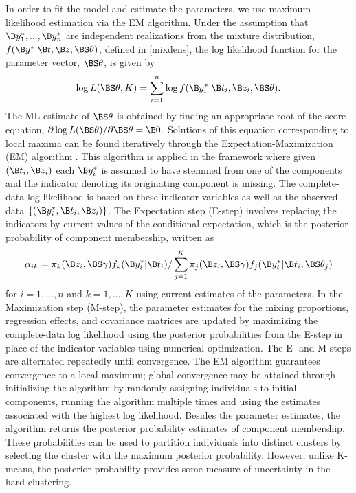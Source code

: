 In order to fit the model and estimate the parameters, we use maximum likelihood estimation via the EM algorithm. Under the assumption that $\B y^{*}_{1},...,\B y^{*}_{n}$ are independent realizations from the mixture distribution, $f(\B y^{*} | \B t, \B z, \BS\theta)$, defined in \ref{mixdens}, the log likelihood function for the parameter vector, $\BS \theta$, is given by
$$\log L(\BS\theta,K)=\sum^{n}_{i=1}\log f(\B y^{*}_{i}|\B t_{i},\B z_{i},\BS \theta).$$
The ML estimate of $\BS\theta$ is obtained by finding an appropriate root of the score equation, $\partial \log L(\BS\theta)/\partial \BS\theta=\B 0.$ Solutions of this equation corresponding to local maxima can be found iteratively through the Expectation-Maximization (EM) algorithm \cite{dempster1977}. This algorithm is applied in the framework where given $(\B t_{i},\B z_{i})$ each $\B y^{*}_{i}$ is assumed to have stemmed from one of the components and the indicator denoting its originating component is missing. The complete-data log likelihood is based on these indicator variables as well as the observed data $\{(\B y^{*}_{i}, \B t_{i}, \B z_{i})\}$. The Expectation step (E-step) involves replacing the indicators by current values of the conditional expectation, which is the posterior probability of component membership, written as
$$\alpha_{ik}=\pi_{k}(\B z_{i},\BS\gamma)f_{k}(\B y^{*}_{i}|\B t_{i})/\sum_{j=1}^{K}\pi_{j}(\B z_{i},\BS\gamma)f_{j}(\B y^{*}_{i}|\B t_{i},\BS \theta_{j})$$
for $i=1,...,n$ and $k=1,...,K$ using current estimates of the parameters. In the Maximization step (M-step), the parameter estimates for the mixing proportions, regression effects, and covariance matrices are updated by maximizing the complete-data log likelihood using the posterior probabilities from the E-step in place of the indicator variables using numerical optimization. The E- and M-steps are alternated repeatedly until convergence. The EM algorithm guarantees convergence to a local maximum; global convergence may be attained through initializing the algorithm by randomly assigning individuals to initial components, running the algorithm multiple times and using the estimates associated with the highest log likelihood. Besides the parameter estimates, the algorithm returns the posterior probability estimates of component membership. These probabilities can be used to partition individuals into distinct clusters by selecting the cluster with the maximum posterior probability. However, unlike K-means, the posterior probability provides some measure of uncertainty in the hard clustering. 

